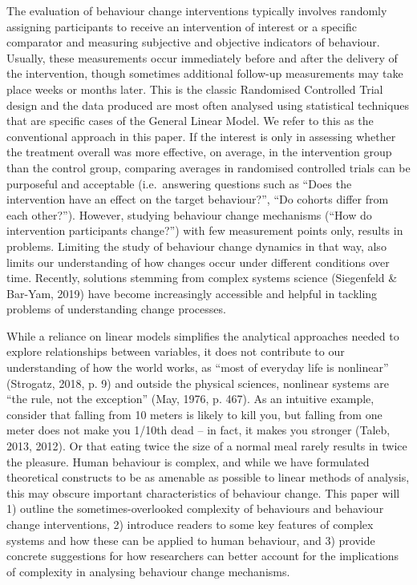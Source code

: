 \documentclass[
  british,
  man,floatsintext]{apa6}
\begin{document}
The evaluation of behaviour change interventions typically involves randomly assigning participants to receive an intervention of interest or a specific comparator and measuring subjective and objective indicators of behaviour. Usually, these measurements occur immediately before and after the delivery of the intervention, though sometimes additional follow-up measurements may take place weeks or months later. This is the classic Randomised Controlled Trial design and the data produced are most often analysed using statistical techniques that are specific cases of the General Linear Model. We refer to this as the conventional approach in this paper. If the interest is only in assessing whether the treatment overall was more effective, on average, in the intervention group than the control group, comparing averages in randomised controlled trials can be purposeful and acceptable (i.e.~answering questions such as \enquote{Does the intervention have an effect on the target behaviour?}, \enquote{Do cohorts differ from each other?}). However, studying behaviour change mechanisms (\enquote{How do intervention participants change?}) with few measurement points only, results in problems. Limiting the study of behaviour change dynamics in that way, also limits our understanding of how changes occur under different conditions over time. Recently, solutions stemming from complex systems science (Siegenfeld \& Bar-Yam, 2019) have become increasingly accessible and helpful in tackling problems of understanding change processes.

While a reliance on linear models simplifies the analytical approaches needed to explore relationships between variables, it does not contribute to our understanding of how the world works, as \enquote{most of everyday life is nonlinear} (Strogatz, 2018, p. 9) and outside the physical sciences, nonlinear systems are \enquote{the rule, not the exception} (May, 1976, p. 467). As an intuitive example, consider that falling from 10 meters is likely to kill you, but falling from one meter does not make you 1/10th dead -- in fact, it makes you stronger (Taleb, 2013, 2012). Or that eating twice the size of a normal meal rarely results in twice the pleasure. Human behaviour is complex, and while we have formulated theoretical constructs to be as amenable as possible to linear methods of analysis, this may obscure important characteristics of behaviour change. This paper will 1) outline the sometimes-overlooked complexity of behaviours and behaviour change interventions, 2) introduce readers to some key features of complex systems and how these can be applied to human behaviour, and 3) provide concrete suggestions for how researchers can better account for the implications of complexity in analysing behaviour change mechanisms.
\end{document}
